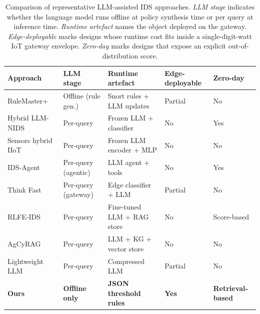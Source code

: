 \begin{table}[t]
  \centering
  \caption{Comparison of representative LLM-assisted IDS approaches.
    \emph{LLM stage} indicates whether the language model runs offline at
    policy synthesis time or per query at inference time.
    \emph{Runtime artefact} names the object deployed on the gateway.
    \emph{Edge-deployable} marks designs whose runtime cost fits inside a
    single-digit-watt IoT gateway envelope.
    \emph{Zero-day} marks designs that expose an explicit
    out-of-distribution score.}
  \label{tab:rw_compare}
  \begin{tabular}{lllll}
    \toprule
    \textbf{Approach} &
    \textbf{LLM stage} &
    \textbf{Runtime artefact} &
    \textbf{Edge-deployable} &
    \textbf{Zero-day} \\
    \midrule
    RuleMaster+~\cite{lian2024rulemaster}              & Offline (rule gen.)   & Snort rules + LLM updates    & Partial   & No          \\
    Hybrid LLM-NIDS~\cite{alhammouri2025hybridllm}          & Per-query             & Frozen LLM + classifier      & No        & Yes         \\
    Sensors hybrid IIoT~\cite{sensors2026hybrid_llm_iiot} & Per-query         & Frozen LLM encoder + MLP     & No        & No          \\
    IDS-Agent~\cite{idsagent2024}                     & Per-query (agentic)   & LLM agent + tools            & No        & Yes         \\
    Think Fast~\cite{jamshidi2025thinkfast}           & Per-query (gateway)   & Edge classifier + LLM        & Partial   & No          \\
    RLFE-IDS~\cite{li2025rlfeids}                       & Per-query             & Fine-tuned LLM + RAG store   & No        & Score-based \\
    AgCyRAG~\cite{agcyrag2025}                        & Per-query             & LLM + KG + vector store      & No        & No          \\
    Lightweight LLM~\cite{comcomap2025lightweight}    & Per-query             & Compressed LLM               & Partial   & No          \\
    \textbf{Ours}                                     & \textbf{Offline only} & \textbf{JSON threshold rules} & \textbf{Yes} & \textbf{Retrieval-based} \\
    \bottomrule
  \end{tabular}
\end{table}

